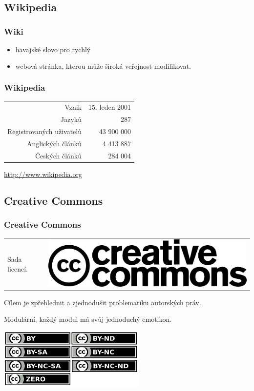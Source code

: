 \documentclass[xetex]{beamer}
\begin{document}
\subsection{Wikipedia}
\begin{frame}
	\frametitle{Wiki}
	\begin{itemize}
		\item<1-2> havajské slovo pro rychlý
		\item<2-2> webová stránka, kterou může široká veřejnost modifikovat.	
	\end{itemize}
\end{frame}
\begin{frame}
	\frametitle{Wikipedia}
	\begin{center}
	\begin{tabular}{r r}
	Vznik				& 15. leden 2001\\
	Jazyků				& 287\\
	Registrovaných uživatelů 	& 43 900 000\\
	Anglických článků 		&  4 413 887\\
	Českých článků	    		&    284 004\\
	\end{tabular}

	\medskip

	\url{http://www.wikipedia.org}
	\end{center}
\end{frame}

\subsection{Creative Commons}
\begin{frame}
	\frametitle{Creative Commons}
	\begin{tabular}{l r}
	Sada licencí. &\hspace{2.5cm}\includegraphics[scale=0.85]{images/cc.logo.png}\\
	\end{tabular}

	\medskip

	Cílem je zpřehlednit a zjednodušit problematiku autorských práv.

	\medskip

	Modulární, každý modul má svůj jednoduchý emotikon.

	\medskip

	\begin{center}
	\includegraphics[scale=0.7]{images/cc-types.jpg}
	\end{center}
\end{frame}
\end{document}
